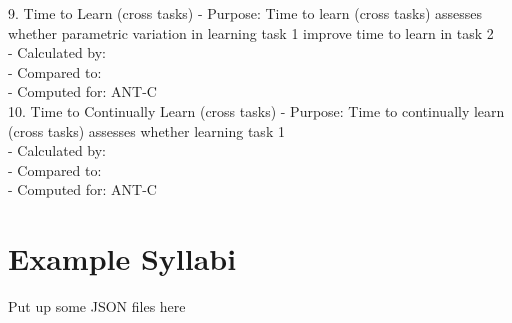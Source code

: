 9. Time to Learn (cross tasks)
    - Purpose: Time to learn (cross tasks) assesses whether parametric variation in learning task 1 improve time to learn in task 2\\
    - Calculated by: \\
    - Compared to:\\
    - Computed for: ANT-C\\
    
10. Time to Continually Learn (cross tasks)
    - Purpose: Time to continually learn (cross tasks) assesses whether learning task 1 \\
    - Calculated by: \\
    - Compared to:\\
    - Computed for: ANT-C\\


\section{Example Syllabi}

Put up some JSON files here
